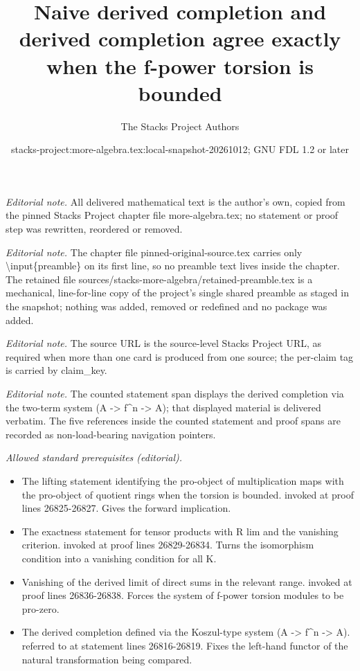 \documentclass[10pt,a4paper]{amsart}
\title{Naive derived completion and derived completion agree exactly when the f-power torsion is bounded}
\author{The Stacks Project Authors}
\date{stacks-project:more-algebra.tex:local-snapshot-20261012; GNU FDL 1.2 or later}
\theoremstyle{plain}
\theoremstyle{definition}
\theoremstyle{remark}
\numberwithin{equation}{subsection}
\begin{document}
\maketitle
\setcounter{subsection}{1}
\noindent\textit{Editorial note.} All delivered mathematical text is the author's own, copied from the pinned Stacks Project chapter file more-algebra.tex; no statement or proof step was rewritten, reordered or removed.\par\medskip
\noindent\textit{Editorial note.} The chapter file pinned-original-source.tex carries only \textbackslash{}input\{preamble\} on its first line, so no preamble text lives inside the chapter. The retained file sources/stacks-more-algebra/retained-preamble.tex is a mechanical, line-for-line copy of the project's single shared preamble as staged in the snapshot; nothing was added, removed or redefined and no package was added.\par\medskip
\noindent\textit{Editorial note.} The source URL is the source-level Stacks Project URL, as required when more than one card is produced from one source; the per-claim tag is carried by claim\_key.\par\medskip
\noindent\textit{Editorial note.} The counted statement span displays the derived completion via the two-term system (A -> f\textasciicircum{}n -> A); that displayed material is delivered verbatim. The five references inside the counted statement and proof spans are recorded as non-load-bearing navigation pointers.\par\medskip
\noindent\textit{Allowed standard prerequisites (editorial).}\begin{itemize}
\item The lifting statement identifying the pro-object of multiplication maps with the pro-object of quotient rings when the torsion is bounded. invoked at proof lines 26825-26827. Gives the forward implication.
\item The exactness statement for tensor products with R lim and the vanishing criterion. invoked at proof lines 26829-26834. Turns the isomorphism condition into a vanishing condition for all K.
\item Vanishing of the derived limit of direct sums in the relevant range. invoked at proof lines 26836-26838. Forces the system of f-power torsion modules to be pro-zero.
\item The derived completion defined via the Koszul-type system (A -> f\textasciicircum{}n -> A). referred to at statement lines 26816-26819. Fixes the left-hand functor of the natural transformation being compared.
\end{itemize}\medskip
\end{document}
